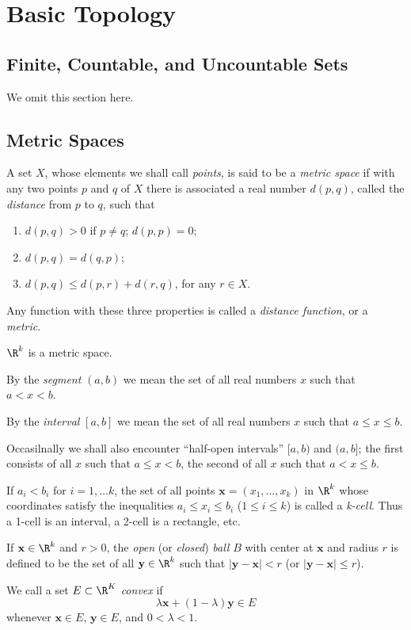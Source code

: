 
\section{Basic Topology}
\subsection{Finite, Countable, and Uncountable Sets}
We omit this section here.
\subsection{Metric Spaces}
\begin{definition}
A set $X$, whose elements we shall call \emph{points}, is said to be a \emph{metric space} if with any two points $p$ and $q$ of $X$ there is associated a real number $d(p,q)$, called the \emph{distance} from $p$ to $q$, such that
\begin{enumerate}
    \item[(a)] $d(p,q)>0$ if $p \neq q$; $d(p,p)=0$;
    \item[(b)] $d(p,q)=d(q,p)$;
    \item[(c)] $d(p,q) \leq d(p,r)+d(r,q)$, for any $r \in X$.  
\end{enumerate}

Any function with these three properties is called a \emph{distance function}, or a \emph{metric}.
\end{definition}
\begin{example}
$\R^k$ is a metric space.
\end{example}
\begin{definition}
By the \emph{segment} $(a,b)$ we mean the set of all real numbers $x$ such that $a<x<b$.

By the \emph{interval} $[a,b]$ we mean the set of all real numbers $x$ such that $a \leq x \leq b$.

Occasilnally we shall also encounter ``half-open intervals'' $[a,b)$ and $(a,b]$; the first consists of all $x$ such that $a \leq x < b$, the second of all $x$ such that $a < x \leq b$.

If $a_i<b_i$ for $i=1, \ldots k$, the set of all points $\mathbf{x}=(x_1, \dots , x_k)$ in $\R^k$ whose coordinates satisfy the inequalities $a_i \leq x_i \leq b_i$ ($1 \leq i \leq k$) is called a \emph{k-cell}.
Thus a 1-cell is an interval, a 2-cell is a rectangle, etc.

If $\mathbf{x} \in \R^k$ and $r>0$, the \emph{open} (or \emph{closed}) \emph{ball} $B$ with center at $\mathbf{x}$ and radius $r$ is defined to be the set of all $\mathbf{y} \in \R^k$ such that $|\mathbf{y}-\mathbf{x}|<r$ (or $|\mathbf{y}-\mathbf{x}| \leq r$).

We call a set $E \subset \R^K$ \emph{convex} if
\[
\lambda\mathbf{x}+(1-\lambda)\mathbf{y} \in E
\]
whenever $\mathbf{x} \in E$, $\mathbf{y} \in E$, and $0<\lambda<1$.
\end{definition}
